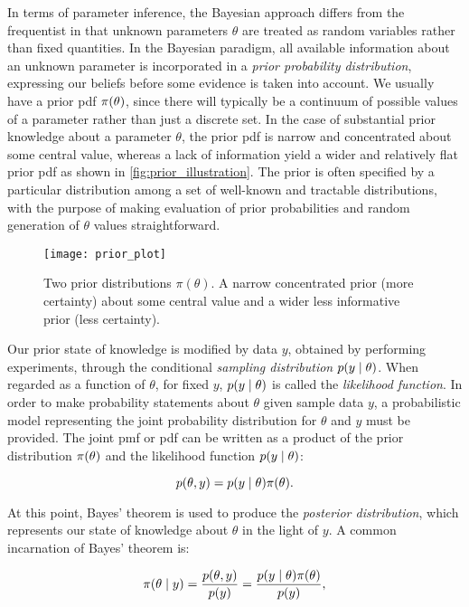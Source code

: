 In terms of parameter inference, the Bayesian approach differs from the frequentist in that unknown parameters $\theta$ are treated as random variables rather than fixed quantities. In the Bayesian paradigm, all available information about an unknown parameter is incorporated in a \textit{prior probability distribution}, expressing our beliefs before some evidence is taken into account. We usually have a prior pdf $\pi \qty(\theta)$, since there will typically be a continuum of possible values of a parameter rather than just a discrete set. In the case of substantial prior knowledge about a parameter $\theta$, the prior pdf is narrow and concentrated about some central value, whereas a lack of information yield a wider and relatively flat prior pdf as shown in \autoref{fig:prior_illustration}. The prior is often specified by a particular distribution among a set of well-known and tractable distributions, with the purpose of making evaluation of prior probabilities and random generation of $\theta$ values straightforward.

\begin{figure}[H]
    \centering
    \texttt{[image: prior\_plot]}
    \caption{Two prior distributions $\pi (\theta)$. A narrow concentrated prior (more certainty) about some central value and a wider less informative prior (less certainty).}
    \label{fig:prior_illustration}
\end{figure}

Our prior state of knowledge is modified by data $y$, obtained by performing experiments, through the conditional \textit{sampling distribution} $p \qty(y \mid \theta)$. When regarded as a function of $\theta$, for fixed $y$, $p \qty(y \mid \theta)$ is called the \textit{likelihood function}. In order to make probability statements about $\theta$ given sample data $y$, a probabilistic model representing the joint probability distribution for $\theta$ and $y$ must be provided. The joint pmf or pdf can be written as a product of the prior distribution $\pi \qty(\theta)$ and the likelihood function $p \qty(y \mid \theta)$:

\begin{equation*}
    p(\theta, y) = p \qty(y \mid \theta) \pi \qty(\theta) .
\end{equation*}

At this point, Bayes' theorem is used to produce the \textit{posterior distribution}, which represents our state of knowledge about $\theta$ in the light of $y$. A common incarnation of Bayes' theorem is:

\begin{equation}\label{eq:bayes_theorem}
    \pi \qty(\theta \mid y) = \frac{p(\theta, y)}{p(y)}  = \frac{p \qty(y \mid \theta) \pi \qty(\theta)}{p(y)},
\end{equation}

